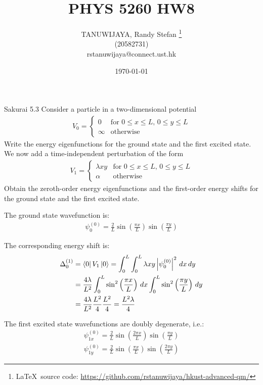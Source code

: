 \documentclass{article}
\title{PHYS 5260 HW8}
\author{TANUWIJAYA, Randy Stefan \footnote{\LaTeX\ source code: \url{https://github.com/rstanuwijaya/hkust-advanced-qm/}}
\\ (20582731) \\ rstanuwijaya@connect.ust.hk}
\affil{Department of Physics - HKUST}
\date{\today}
\begin{document}
	\maketitle
	\begin{section}{Sakurai 5.3}
		Consider a particle in a two-dimensional potential
		\begin{align*}
			V_0 = \begin{cases}
				0 & \text{for $0 \leq x \leq L$, $0 \leq y \leq L$} \\
				\infty & \text{otherwise}
			\end{cases}
		\end{align*}
		Write the energy eigenfunctions for the ground state and the first excited state. We now add a time-independent perturbation of the form
		\begin{align*}
			V_1 = \begin{cases}
				\lambda x y & \text{for $0 \leq x \leq L$, $0 \leq y \leq L$} \\
				\alpha & \text{otherwise}
			\end{cases}
		\end{align*}
		Obtain the zeroth-order energy eigenfunctions and the first-order energy shifts for the ground state and the first excited state.
		\begin{tcolorbox}[breakable]
			The ground state wavefunction is:
			\begin{align*}
				\psi_0^{(0)} = \frac{2}{L} \sin \left( \frac{\pi x}{L} \right) \sin \left( \frac{\pi y}{L} \right) 
			\end{align*}

			The corresponding energy shift is:
			\begin{align*}
				\Delta_0^{(1)} &= \bra{0}V_1\ket{0} = \int_{0}^{L} \int_{0}^{L} \lambda x y \left|\psi_0^{(0)}\right|^2 \, dx \, dy \\
				&= \frac{4\lambda}{L^2} \int_{0}^{L} \sin^2 \left( \frac{\pi x}{L} \right) \, dx \int_{0}^{L} \sin^2 \left( \frac{\pi y}{L} \right) \, dy \\
				&= \frac{4\lambda}{L^2} \frac{L^2}{4} \frac{L^2}{4} = \frac{L^2\lambda}{4}
			\end{align*}

			The first excited state wavefunctions are doubly degenerate, i.e.:
			\begin{align*}
				\psi_{1x}^{(0)} = \frac{2}{L} \sin \left( \frac{2\pi x}{L} \right) \sin \left( \frac{\pi y}{L} \right)  \\
				\psi_{1y}^{(0)} = \frac{2}{L} \sin \left( \frac{\pi x}{L} \right) \sin \left( \frac{2\pi y}{L} \right) 
			\end{align*}


\end{tcolorbox}
\end{section}
\end{document}
